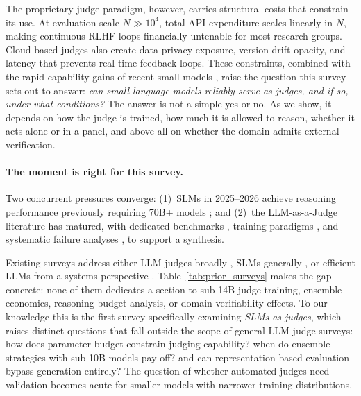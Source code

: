 \documentclass[11pt]{article}
\begin{document}
The proprietary judge paradigm, however, carries structural costs that constrain its use. At evaluation scale $N \gg 10^4$, total API expenditure scales linearly in $N$, making continuous RLHF loops financially untenable for most research groups. Cloud-based judges also create data-privacy exposure, version-drift opacity, and latency that prevents real-time feedback loops. These constraints, combined with the rapid capability gains of recent small models \citep{abdin2024phi, yang2025qwen3, grattafiori2024llama, guo2025deepseek}, raise the question this survey sets out to answer: \textit{can small language models reliably serve as judges, and if so, under what conditions?} The answer is not a simple yes or no. As we show, it depends on how the judge is trained, how much it is allowed to reason, whether it acts alone or in a panel, and above all on whether the domain admits external verification.

\paragraph{The moment is right for this survey.} Two concurrent pressures converge: (1)~SLMs in 2025--2026 achieve reasoning performance previously requiring 70B+ models \citep{abouelenin2025phi, guo2025deepseek}; and (2)~the LLM-as-a-Judge literature has matured, with dedicated benchmarks \citep{tan2025judgebench, bi2026judgeboard}, training paradigms \citep{whitehouse2025j1, deshpande2024glider}, and systematic failure analyses \citep{wynn2025talk, zhang2025stop}, to support a synthesis.

Existing surveys address either LLM judges broadly \citep{gu2024survey, li2025generation, li2024llms}, SLMs generally \citep{lu2024small}, or efficient LLMs from a systems perspective \citep{wan2023efficient}. Table~\ref{tab:prior_surveys} makes the gap concrete: none of them dedicates a section to sub-14B judge training, ensemble economics, reasoning-budget analysis, or domain-verifiability effects. To our knowledge this is the first survey specifically examining \emph{SLMs as judges}, which raises distinct questions that fall outside the scope of general LLM-judge surveys: how does parameter budget constrain judging capability? when do ensemble strategies with sub-10B models pay off? and can representation-based evaluation bypass generation entirely? The question of whether automated judges need validation \citep{shankar2024validates} becomes acute for smaller models with narrower training distributions.
\end{document}
